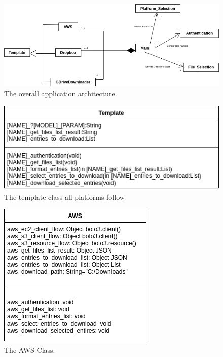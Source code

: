 \documentclass{article}
\begin{document}
\begin{figure}[H]
\includegraphics[scale=.65]{des_all}
\centering
\caption{The overall application architecture.}
\end{figure}

\begin{figure}[p]
\includegraphics[scale=.5]{des_template}
\centering
\caption{The template class all platforms follow}
\end{figure}

\begin{figure}[p]
\includegraphics[scale=.5]{des_aws}
\centering
\caption{The AWS Class.}
\end{figure}
\end{document}
